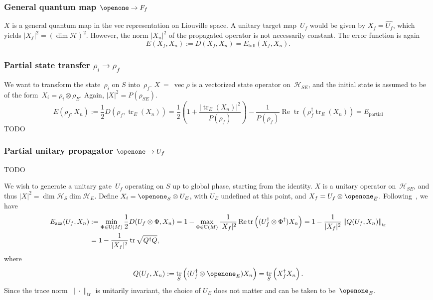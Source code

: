 \documentclass[aps, pra, a4paper, longbibliography]{revtex4}
\newcommand{\I}{\openone}
\newcommand{\be}{\begin{equation}}
\newcommand{\ee}{\end{equation}}
\newcommand{\hilb}[1]{\mathcal{#1}}
\DeclareMathOperator{\tr}{tr}
\DeclareMathOperator{\re}{Re}
\DeclareMathOperator{\cvec}{vec}
\begin{document}
\subsubsection{General quantum map $\I \to F_f$}

$X$ is a general quantum map in the vec representation on Liouville space.
A unitary target map~$U_f$ would be given by
$X_f = \hat{U_f}$, which yields $|X_f|^2 = (\dim \hilb{H})^2$.
However, the norm $|X_n|^2$ of the propagated operator
is not necessarily constant. The error function is again
\be
E(X_f, X_n)
:= D(X_f, X_n)
= E_\text{full}(X_f, X_n).
\ee


\subsubsection{Partial state transfer $\rho_i \to \rho_f$}

We want to transform the state~$\rho_i$ on $S$ into~$\rho_f$.
$X~=~\cvec{\rho}$ is a vectorized state operator on~$\hilb{H}_{SE}$, and
the initial state is assumed to be of the form~$X_i = \rho_i \otimes \rho_E$.
Again, $|X|^2 = P(\rho_{SE})$.
\be
E(\rho_f, X_n)
:= \frac{1}{2} D(\rho_f, \tr_E(X_n))
= \frac{1}{2}\left(1 +\frac{|\tr_E(X_n)|^2}{P(\rho_f)}\right)
-\frac{1}{P(\rho_f)} \re \tr(\rho_f^\dagger \tr_E(X_n))
= E_\text{partial}
\ee
TODO


\subsubsection{Partial unitary propagator $\I \to U_f$}

TODO

We wish to generate a unitary gate~$U_f$ operating on $S$ up to global
phase, starting from the identity.
$X$ is a unitary operator on~$\hilb{H}_{SE}$, and
thus $|X|^2 = \dim \hilb{H}_S \dim \hilb{H}_E$.
Define $X_i = \I_S \otimes U_E$, with $U_E$ undefined at this point,
and $X_f = U_f \otimes \I_E$.
Following~\cite{kosut_2006,floether_2012}, we have
\begin{align}
\notag
E_\text{zzz}(U_f, X_n)
&:= \min_{\Phi \in \text{U}(M)} \frac{1}{2} D(U_f \otimes \Phi, X_n)
= 1 -\max_{\Phi \in \text{U}(M)} \frac{1}{|X_f|^2} \re \tr\left((U_f^\dagger \otimes \Phi^\dagger) X_n\right)
= 1 -\frac{1}{|X_f|^2} \left\|Q(U_f, X_n)\right\|_{\tr}\\
&= 1 -\frac{1}{|X_f|^2} \tr \sqrt{Q^\dagger Q},
\end{align}
where
\be
Q(U_f, X_n)
:= \tr_S\left((U_f^\dagger \otimes \I_E) X_n\right)
= \tr_S\left(X_f^\dagger X_n\right).
\ee
Since the trace norm $\|\cdot\|_{\tr}$ is unitarily invariant, the
choice of $U_E$ does not matter and can be taken to be~$\I_E$.
\end{document}
